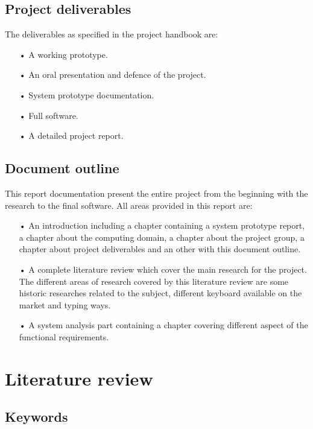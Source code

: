 \chapter{Project deliverables}
The deliverables as specified in the project handbook are:
\begin{itemize}
\item[•]A working prototype.
\item[•]An oral presentation and defence of the project.
\item[•]System prototype documentation.
\item[•]Full software.
\item[•]A detailed project report.
\end{itemize}

\chapter{Document outline}
This report documentation present the entire project from the beginning with the research to the final software.
All areas provided in this report are:
\begin{itemize}
\item[•]An introduction including a chapter containing a system prototype report, a chapter about the computing domain, a chapter about the project group, a chapter about project deliverables and an other with this document outline.
\item[•]A complete literature review which cover the main research for the project. The different areas of research covered by this literature review are some historic researches related to the subject, different keyboard available on the market and typing ways.  
\item[•]A system analysis part containing a chapter covering different aspect of the functional requirements. 
\end{itemize}

\part{Literature review}
%
\chapter*{Keywords}
\begin{sortedlist}
\end{sortedlist}

